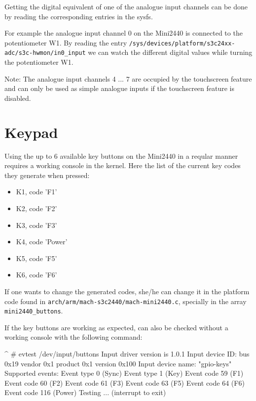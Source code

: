 Getting the digital equivalent of one of the analogue input channels can be
done by reading the corresponding entries in the sysfs.

For example the analogue input channel 0 on the Mini2440 is connected to the
potentiometer W1. By reading the entry
\texttt{/sys/devices/platform/s3c24xx-adc/s3c-hwmon/in0\_input}
we can watch the different digital values while turning the potentiometer W1.

Note: The analogue input channels 4 ... 7 are occupied by the touchscreen
feature and can only be used as simple analogue inputs if the touchscreen
feature is disabled.


\section{Keypad}						\label{sec:ADC}

Using the up to 6 available key buttons on the Mini2440 in a reqular manner
requires a working console in the kernel. Here the list of the current key codes
they generate when pressed:

\begin{itemize}
	\item K1, code 'F1'
	\item K2, code 'F2'
	\item K3, code 'F3'
	\item K4, code 'Power'
	\item K5, code 'F5'
	\item K6, code 'F6'
\end{itemize}

If one wants to change the generated codes, she/he can change it in the
platform code found in \texttt{arch/arm/mach-s3c2440/mach-mini2440.c},
specially in the array \texttt{mini2440\_buttons}.

If the key buttons are working as expected, can also be checked without a
working console with the following command:

\begin{ptxshell}[escapechar=|]{^}
# evtest /dev/input/buttons
Input driver version is 1.0.1
Input device ID: bus 0x19 vendor 0x1 product 0x1 version 0x100
Input device name: "gpio-keys"
Supported events:
  Event type 0 (Sync)
  Event type 1 (Key)
    Event code 59 (F1)
    Event code 60 (F2)
    Event code 61 (F3)
    Event code 63 (F5)
    Event code 64 (F6)
    Event code 116 (Power)
Testing ... (interrupt to exit)
\end{ptxshell}

